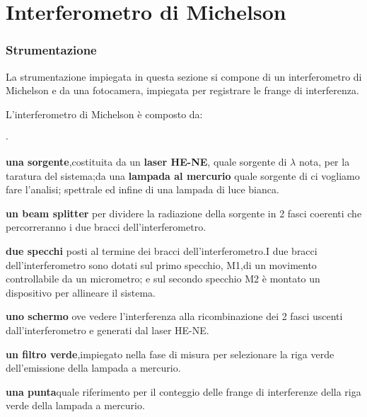 \newpage
\part{Interferometro di Michelson }

\section{Strumentazione}
La strumentazione impiegata in questa sezione  si 
compone di un interferometro di Michelson e da una fotocamera,
impiegata per registrare le frange di interferenza.

L'interferometro di Michelson è composto da:
\begin{list}{$\cdot$}{}
\item \textbf{una sorgente},costituita da un \textbf{laser HE-NE}, 
quale sorgente di $\lambda$ nota,
per la taratura del sistema;da una \textbf{lampada al mercurio} quale 
sorgente di ci vogliamo fare l'analisi; spettrale ed infine di una lampada
di luce bianca.
\item \textbf{un beam splitter} per dividere la radiazione della sorgente
in 2 fasci coerenti che percorreranno i
due bracci dell'interferometro.
\item \textbf{due specchi} posti al termine dei bracci 
dell'interferometro.I due bracci dell'interferometro
sono dotati sul primo specchio, M1,di un movimento 
controllabile da un micrometro;
e sul secondo specchio M2 è montato un dispositivo per allineare il sistema. 
\item \textbf{uno schermo} ove vedere l'interferenza alla ricombinazione dei 2 
fasci uscenti dall'interferometro e generati dal laser HE-NE.
\item \textbf{un filtro verde},impiegato nella fase di misura per selezionare 
la riga verde 
dell'emissione della lampada a mercurio.
\item \textbf{una punta}quale riferimento per il conteggio delle frange di interferenze 
della riga verde della lampada a mercurio.
\end{list}
\bigskip


